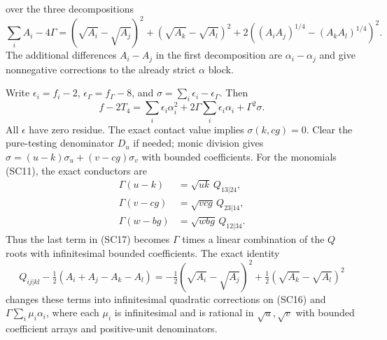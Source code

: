 over the three decompositions
\[
 \sum_iA_i-4\Gamma=(\sqrt{A_i}-\sqrt{A_j})^2
 +(\sqrt{A_k}-\sqrt{A_l})^2
 +2((A_iA_j)^{1/4}-(A_kA_l)^{1/4})^2.
\]
The additional differences $A_i-A_j$ in the first decomposition are
$\alpha_i-\alpha_j$ and give nonnegative corrections to the already
strict $\alpha$ block.

Write $\epsilon_i=f_i-2$, $\epsilon_\Gamma=f_\Gamma-8$, and
$\sigma=\sum_i\epsilon_i-\epsilon_\Gamma$. Then
\[
 f-2T_4=\sum_i\epsilon_i\alpha_i^2
       +2\Gamma\sum_i\epsilon_i\alpha_i+\Gamma^2\sigma.
 \tag{SC17}
\]
All $\epsilon$ have zero residue. The exact contact value implies
$\sigma(k,cg)=0$. Clear the pure-testing denominator $D_u$ if needed;
monic division gives
$\sigma=(u-k)\sigma_u+(v-cg)\sigma_v$ with bounded coefficients.
For the monomials (SC11), the exact conductors are
\[
\begin{aligned}
 \Gamma(u-k)&=\sqrt{uk}\,Q_{13|24},\\
 \Gamma(v-cg)&=\sqrt{vcg}\,Q_{23|14},\\
 \Gamma(w-bg)&=\sqrt{wbg}\,Q_{12|34}.
\end{aligned}                                                     \tag{SC18}
\]
Thus the last term in (SC17) becomes $\Gamma$ times a linear
combination of the $Q$ roots with infinitesimal bounded coefficients.
The exact identity
\[
 Q_{ij|kl}-\tfrac12(A_i+A_j-A_k-A_l)
 =-\tfrac12(\sqrt{A_i}-\sqrt{A_j})^2
  +\tfrac12(\sqrt{A_k}-\sqrt{A_l})^2               \tag{SC19}
\]
changes these terms into infinitesimal quadratic corrections on (SC16)
and $\Gamma\sum_i\mu_i\alpha_i$, where each $\mu_i$ is infinitesimal
and is rational in $\sqrt u,\sqrt v$ with bounded coefficient arrays
and positive-unit denominators.

